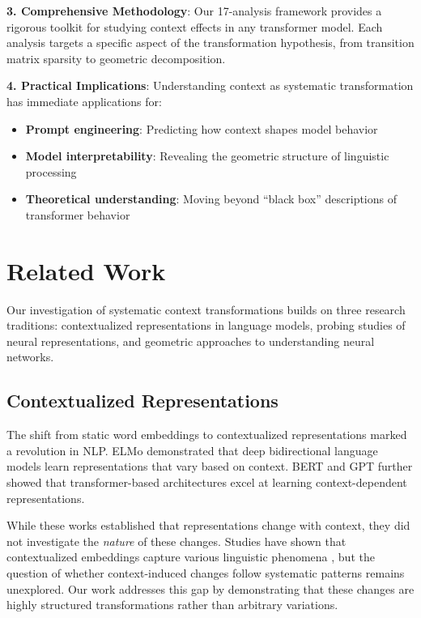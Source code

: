 \documentclass[11pt]{article}
\begin{document}
\textbf{3. Comprehensive Methodology}: Our 17-analysis framework provides a rigorous toolkit for studying context effects in any transformer model. Each analysis targets a specific aspect of the transformation hypothesis, from transition matrix sparsity to geometric decomposition.

\textbf{4. Practical Implications}: Understanding context as systematic transformation has immediate applications for:
\begin{itemize}
    \item \textbf{Prompt engineering}: Predicting how context shapes model behavior
    \item \textbf{Model interpretability}: Revealing the geometric structure of linguistic processing  
    \item \textbf{Theoretical understanding}: Moving beyond ``black box'' descriptions of transformer behavior
\end{itemize}

\section{Related Work}

Our investigation of systematic context transformations builds on three research traditions: contextualized representations in language models, probing studies of neural representations, and geometric approaches to understanding neural networks.

\subsection{Contextualized Representations}

The shift from static word embeddings \cite{mikolov2013word2vec, pennington2014glove} to contextualized representations marked a revolution in NLP. ELMo \cite{peters2018elmo} demonstrated that deep bidirectional language models learn representations that vary based on context. BERT \cite{devlin2019bert} and GPT \cite{radford2018gpt, radford2019gpt2} further showed that transformer-based architectures excel at learning context-dependent representations.

While these works established that representations change with context, they did not investigate the \emph{nature} of these changes. Studies have shown that contextualized embeddings capture various linguistic phenomena \cite{tenney2019bert, rogers2020primer}, but the question of whether context-induced changes follow systematic patterns remains unexplored. Our work addresses this gap by demonstrating that these changes are highly structured transformations rather than arbitrary variations.
\end{document}
